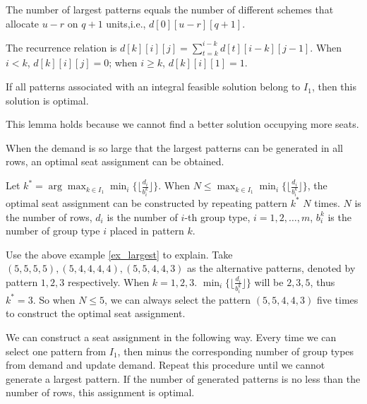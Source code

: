 The number of largest patterns equals the number of different schemes that allocate $u-r$ on $q+1$ units,i.e., $d[0][u-r][q+1]$.

The recurrence relation is $d[k][i][j] = \sum_{t=k}^{i-k} d[t][i-k][j-1]$. 
When $i < k$, $d[k][i][j] =0$; when $i \geq k$, $d[k][i][1] =1$.

\begin{lem}
If all patterns associated with an integral feasible solution belong to $I_1$, then this solution is optimal.
\end{lem}

This lemma holds because we cannot find a better solution occupying more seats.

When the demand is so large that the largest patterns can be generated in all rows, an optimal seat assignment can be obtained.

\begin{prop}\label{prop_I_1}
  Let $k^{*} = \arg \max_{k\in I_1} \min_{i} \{\lfloor \frac{d_i}{b_i^k}\rfloor\}$. 
  When $N \leq \max_{k\in I_1} \min_{i} \{\lfloor \frac{d_i}{b_i^k}\rfloor\}$, the optimal seat assignment can be constructed by repeating pattern $k^*$ $N$ times.
  $N$ is the number of rows, $d_i$ is the number of $i$-th group type, $i = 1,2,\ldots, m$, $b_i^k$ is the number of group type $i$ placed in pattern $k$.
\end{prop}

Use the above example \ref{ex_largest} to explain. Take $(5,5,5,5), (5,4,4,4,4), (5,5,4,4,3)$ as the alternative patterns, denoted by pattern $1, 2, 3$ respectively. When $k = 1,2,3$. $\min_{i} \{\lfloor \frac{d_i}{b_i^k}\rfloor\}$ will be $2,3,5$, thus $k^{*}= 3$. So when $N \leq 5$, we can always select the pattern $(5,5,4,4,3)$ five times to construct the optimal seat assignment.

\begin{prop}\label{prop_I_2}
  We can construct a seat assignment in the following way. Every time we can select one pattern from $I_1$, then minus the corresponding number of group types from demand and update demand. Repeat this procedure until we cannot generate a largest pattern. If the number of generated patterns is no less than the number of rows, this assignment is optimal.
\end{prop}


\newpage
